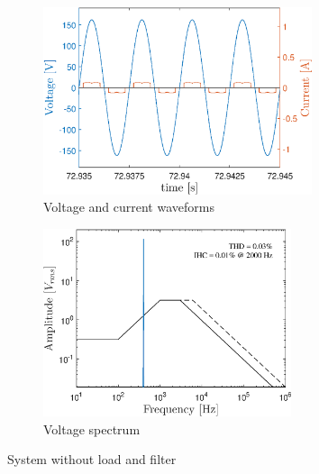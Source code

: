 \begin{doublespacing}



\begin{figure}[!htb] %
	\centering
	\begin{subfigure}[b]{0.5\textwidth}
		\centering
		\includegraphics[height=5.5cm]{Figures/artigo_unfilt_1.eps}
		\caption{Voltage and current waveforms} 
		\label{fig:artigo_unfilt_1.eps}
	\end{subfigure}%
	\hfill
	\begin{subfigure}[b]{0.5\textwidth}  
		\centering 
		\includegraphics[height=5.5cm]{Figures/artigo_unfilt_2.eps}
		\caption{Voltage spectrum}    
		\label{fig:artigo_unfilt_2.eps}
	\end{subfigure}%
	\caption{System without load and filter}
	\label{fig:1}
\end{figure}


\end{doublespacing}
